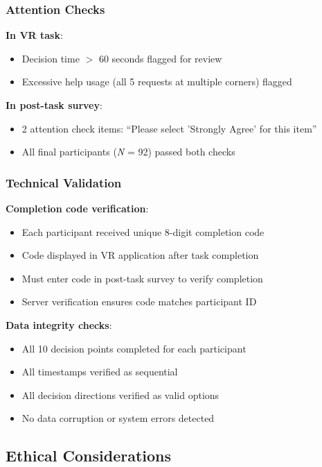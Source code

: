 \documentclass[12pt]{article}
\begin{document}
\subsubsection{Attention Checks}

\textbf{In VR task}:
\begin{itemize}
    \item Decision time $>$ 60 seconds flagged for review
    \item Excessive help usage (all 5 requests at multiple corners) flagged
\end{itemize}

\textbf{In post-task survey}:
\begin{itemize}
    \item 2 attention check items: ``Please select 'Strongly Agree' for this item''
    \item All final participants (\textit{N} = 92) passed both checks
\end{itemize}

\subsubsection{Technical Validation}

\textbf{Completion code verification}:
\begin{itemize}
    \item Each participant received unique 8-digit completion code
    \item Code displayed in VR application after task completion
    \item Must enter code in post-task survey to verify completion
    \item Server verification ensures code matches participant ID
\end{itemize}

\textbf{Data integrity checks}:
\begin{itemize}
    \item All 10 decision points completed for each participant
    \item All timestamps verified as sequential
    \item All decision directions verified as valid options
    \item No data corruption or system errors detected
\end{itemize}

\subsection{Ethical Considerations}
\end{document}
